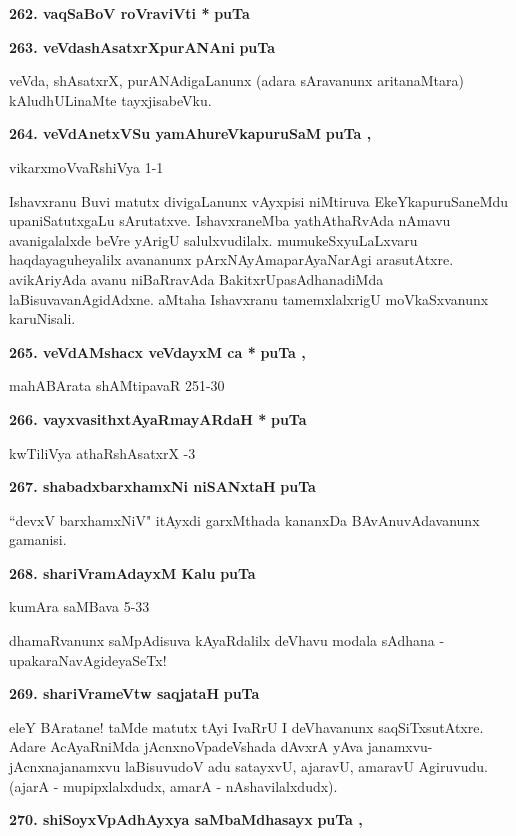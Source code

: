 \medskip
\noindent
\textbf{262. vaqSaBoV roVraviVti *} \hfill{\bf puTa \pageref{117}}

\eject

\noindent
\textbf{263. veVdashAsatxrXpurANAni} \hfill{\bf puTa \pageref{42b}}

\smallskip
veVda, shAsatxrX, purANAdigaLanunx (adara sAravanunx aritanaMtara) kAludhULinaMte tayxjisabeVku.

\medskip
\noindent
\textbf{264. veVdAnetxVSu yamAhureVkapuruSaM} \hfill{\bf puTa \pageref{232}, \pageref{243b}}

\hfill{vikarxmoVvaRshiVya 1-1}

\smallskip
Ishavxranu Buvi matutx divigaLanunx vAyxpisi niMtiruva EkeYkapuruSaneMdu upaniSatutxgaLu sArutatxve. IshavxraneMba yathAthaRvAda nAmavu avanigalalxde beVre yArigU salulxvudilalx. mumukeSxyuLaLxvaru haqdayaguheyalilx avananunx pArxNAyAmaparAyaNarAgi arasutAtxre. avikAriyAda avanu niBaRravAda BakitxrUpasAdhanadiMda laBisuvavanAgidAdxne. aMtaha Ishavxranu tamemxlalxrigU moVkaSxvanunx karuNisali.

\medskip
\noindent
\textbf{265. veVdAMshacx veVdayxM ca *} \hfill{\bf puTa \pageref{133a}, \pageref{144}}

\hfill{mahABArata shAMtipavaR 251-30}

\medskip
\noindent
\textbf{266. vayxvasithxtAyaRmayARdaH *} \hfill{\bf puTa \pageref{90}}

\hfill{kwTiliVya athaRshAsatxrX -3}

\medskip
\noindent
\textbf{267. shabadxbarxhamxNi niSANxtaH} \hfill{\bf puTa \pageref{page160a}}

\smallskip
``devxV barxhamxNiV" itAyxdi garxMthada kananxDa BAvAnuvAdavanunx gamanisi.

\medskip
\noindent
\textbf{268. shariVramAdayxM Kalu} \hfill{\bf puTa \pageref{77}}

\hfill{kumAra saMBava 5-33}

\smallskip
dhamaRvanunx saMpAdisuva kAyaRdalilx deVhavu modala sAdhana - upakaraNavAgideyaSeTx!

\medskip
\noindent
\textbf{269. shariVrameVtw saqjataH} \hfill{\bf puTa \pageref{91a}}

\smallskip
eleY BAratane! taMde matutx tAyi IvaRrU I deVhavanunx saqSiTxsutAtxre. Adare AcAyaRniMda jAcnxnoVpadeVshada dAvxrA yAva janamxvu-jAcnxnajanamxvu laBisuvudoV adu satayxvU, ajaravU, amaravU Agiruvudu. (ajarA - mupipxlalxdudx, amarA - nAshavilalxdudx).


\medskip
\noindent
\textbf{270. shiSoyxVpAdhAyxya saMbaMdhasayx} \hfill{\bf puTa \pageref{38}, \pageref{83}}

